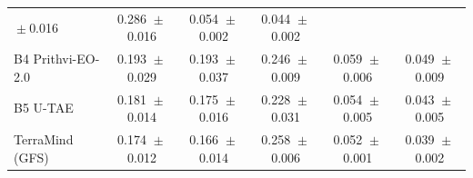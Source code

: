\begin{tabular}{lccccc}
${}\pm{}$0.016%
& 0.286%
${}\pm{}$0.016%
& 0.054%
${}\pm{}$0.002%
& 0.044%
${}\pm{}$0.002%
\\
B4 Prithvi-EO-2.0
& 0.193%
${}\pm{}$0.029%
& 0.193%
${}\pm{}$0.037%
& 0.246%
${}\pm{}$0.009%
& 0.059%
${}\pm{}$0.006%
& 0.049%
${}\pm{}$0.009%
\\
B5 U-TAE
& 0.181%
${}\pm{}$0.014%
& 0.175%
${}\pm{}$0.016%
& 0.228%
${}\pm{}$0.031%
& 0.054%
${}\pm{}$0.005%
& 0.043%
${}\pm{}$0.005%
\\
TerraMind (GFS)
& 0.174%
${}\pm{}$0.012%
& 0.166%
${}\pm{}$0.014%
& 0.258%
${}\pm{}$0.006%
& 0.052%
${}\pm{}$0.001%
& 0.039%
${}\pm{}$0.002%
\\
\bottomrule
\end{tabular}
